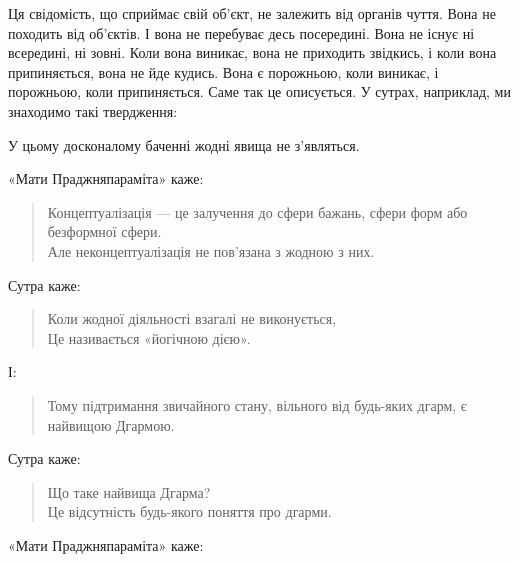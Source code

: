 \documentclass{article}
\begin{document}
Ця свідомість, що сприймає свій об’єкт, не залежить від органів чуття. Вона не походить від об’єктів. І вона не перебуває десь посередині. Вона не існує ні всередині, ні зовні. Коли вона виникає, вона не приходить звідкись, і коли вона припиняється, вона не йде кудись. Вона є порожньою, коли виникає, і порожньою, коли припиняється. Саме так це описується. У сутрах, наприклад, ми знаходимо такі твердження:

У цьому досконалому баченні жодні явища не з’являться.

«Мати Праджняпараміта» каже:

\begin{verse}
        Концептуалізація — це залучення до сфери бажань, сфери форм або безформної сфери. \\
        Але неконцептуалізація не пов’язана з жодною з них. \\
\end{verse}

Сутра каже:

\begin{verse}
        Коли жодної діяльності взагалі не виконується, \\
        Це називається «йогічною дією».
\end{verse}

І:

\begin{verse}
        Тому підтримання звичайного стану, вільного від будь-яких дгарм, є найвищою Дгармою. \\
\end{verse}

Сутра каже:

\begin{verse}
        Що таке найвища Дгарма? \\
        Це відсутність будь-якого поняття про дгарми.
\end{verse}

«Мати Праджняпараміта» каже:
\end{document}
